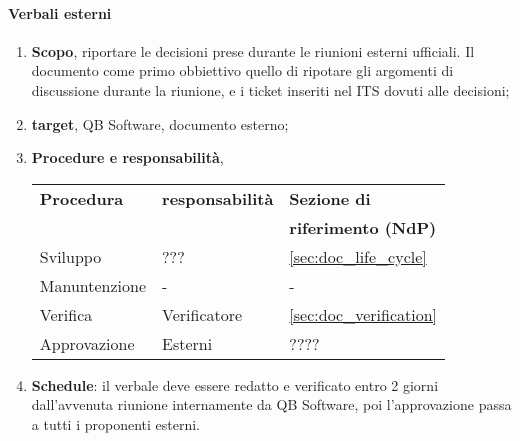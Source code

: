         \paragraph{Verbali esterni}
            \begin{enumerate}
                \item \textbf{Scopo}, riportare le decisioni prese durante le riunioni esterni ufficiali. Il documento come primo obbiettivo quello di ripotare gli argomenti di discussione durante la riunione, e i ticket inseriti nel ITS dovuti alle decisioni;
                \item \textbf{target}, QB Software, documento esterno;
                \item \textbf{Procedure e responsabilità},
                    \newline
                    \begin{tabularx}{0.93\textwidth}{|X|X|X|}
                        \hline
                        \textbf{Procedura} & \textbf{responsabilità} & \textbf{Sezione di} \\
                        & & \textbf{riferimento (NdP)} \\
                        \hline
                        Sviluppo & ??? &  \ref{sec:doc_life_cycle}
                        \\\hline
                        Manuntenzione & - & -
                        \\\hline
                        Verifica & Verificatore & \ref{sec:doc_verification}
                        \\\hline
                        Approvazione & Esterni & ????
                        \\\hline
                    \end{tabularx}
                \item \textbf{Schedule}: il verbale deve essere redatto e verificato entro 2 giorni dall'avvenuta riunione internamente da QB Software, poi l'approvazione passa a tutti i proponenti esterni.
            \end{enumerate} 

